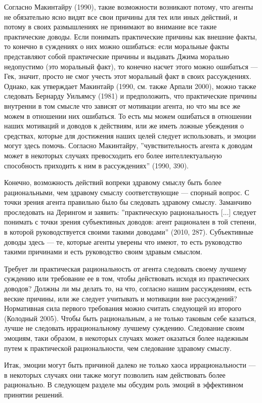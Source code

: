 \documentclass[11pt]{book}
\begin{document}
Согласно Макинтайру (1990), такие возможности возникают потому, что агенты не обязательно ясно видят все свои причины для тех или иных действий, и потому в своих размышлениях не принимают во внимание все такие практические доводы. Если понимать практические причины как внешние факты, то конечно в суждениях о них можно ошибаться: если моральные факты представляют собой практические причины и выдавать Джима морально недопустимо (это моральный факт), то конечно насчет этого можно ошибаться --- Гек, значит, просто не смог учесть этот моральный факт в своих рассуждениях. Однако, как утверждает Макинтайр (1990, см. также Арпали 2000), можно также следовать Бернарду Уильямсу (1981) и предположить, что практические причины внутренни в том смысле что зависят от мотивации агента, но что мы все же можем в отношении них ошибаться. То есть мы можем ошибаться в отношении наших мотиваций и доводов к действиям, или же иметь ложные убеждения о средствах, которые для достижения наших целей следует использовать, и эмоции могут здесь помочь. Согласно Макинтайру, ''чувствительность агента к доводам может в некоторых случаях превосходить его более интеллектуальную способность приходить к ним в рассуждениях'' (1990, 390).

Конечно, возможность действий вопреки здравому смыслу быть более рациональными, чем здравому смыслу соответствующие --- спорный вопрос. С точки зрения агента правильно было бы следовать здравому смыслу. Заманчиво проследовать на Дерингом и заявить: ''практическую рациональность [...] следует понимать с точки зрения субъективных доводов: агент рационален в той степени, в которой руководствуется своими такими доводами'' (2010, 287). Субъективные доводы здесь --- те, которые агенты уверены что имеют, то есть руководство такими причинами и есть руководство своим здравым смыслом.

Требует ли практическая рациональность от агента следовать своему лучшему суждению или требование ее в том, чтобы действовать исходя из практических доводов? Должны ли мы делать то, на что, согласно нашим рассуждениям, есть веские причины, или же следует учитывать и мотивации вне рассуждений? Нормативная сила первого требования можно считать следующей из второго (Колодный 2005). Чтобы быть рациональным, а не только таковым себе казаться, лучше не следовать иррациональному лучшему суждению. Следование своим эмоциям, таки образом, в некоторых случаях может оказаться более надежным путем к практической рациональности, чем следование здравому смыслу.

Итак, эмоции могут быть причиной далеко не только хаоса иррациональности --- в некоторых случаях они также могут позволить нам действовать более рационально. В следующем разделе мы обсудим роль эмоций в эффективном принятии решений.
\end{document}
